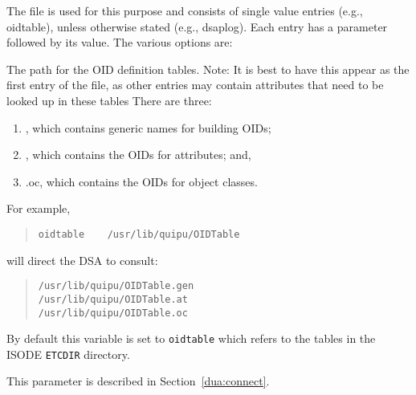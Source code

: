The file  is used for this purpose and
consists of single value entries (e.g., oidtable), unless otherwise
stated (e.g., dsaplog). 
Each entry has a parameter followed by its
value.
The various options are:
\begin{describe}
\item [\verb"oidtable":]
The path for the OID definition tables.
Note: It is best to have this appear as the first entry of the
 file, as 
other entries may contain attributes that need to be looked up in these
tables
There are three:
\begin{enumerate}
\item {},
which contains generic names for building OIDs;
\item {},
which contains the OIDs for attributes; and,
\item {}.oc,
which contains the OIDs for object classes.
\end{enumerate}
For example,
\begin{quote}\small\begin{verbatim}
oidtable    /usr/lib/quipu/OIDTable
\end{verbatim}\end{quote}
will direct the DSA to consult:
\begin{quote}\begin{verbatim}
/usr/lib/quipu/OIDTable.gen
/usr/lib/quipu/OIDTable.at
/usr/lib/quipu/OIDTable.oc
\end{verbatim}\end{quote}
By default this variable is set to \verb"oidtable" which refers to the tables
 in the ISODE \verb"ETCDIR" directory.

\item [\verb"dsa\_address":]
This parameter is described in Section~\ref{dua:connect}.


\end{describe}

